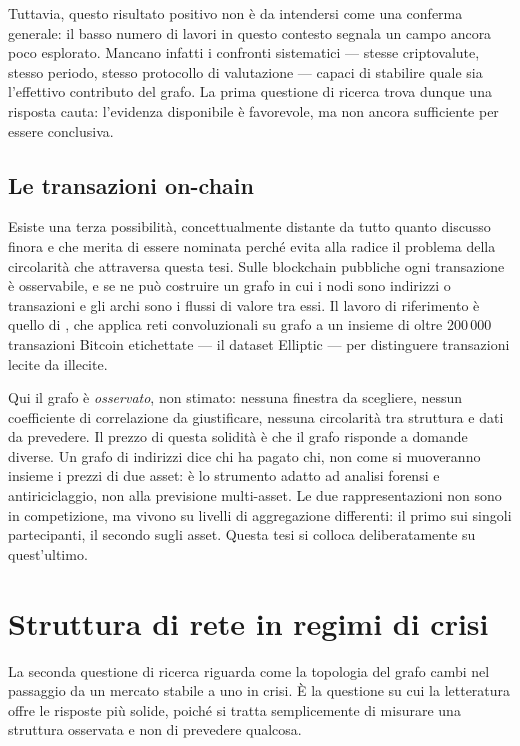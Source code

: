 Tuttavia, questo risultato positivo non è da intendersi come una conferma generale: il basso numero di lavori in questo contesto segnala un campo ancora poco esplorato. Mancano infatti i confronti sistematici — stesse criptovalute, stesso periodo, stesso protocollo di valutazione — capaci di stabilire quale sia l'effettivo contributo del grafo. La prima questione di ricerca trova dunque una risposta cauta: l'evidenza disponibile è favorevole, ma non ancora sufficiente per essere conclusiva.

\subsection{Le transazioni on-chain}

Esiste una terza possibilità, concettualmente distante da tutto quanto discusso finora e che merita di essere nominata perché evita alla radice il problema della circolarità che attraversa questa tesi. Sulle blockchain pubbliche ogni transazione è osservabile, e se ne può costruire un grafo in cui i nodi sono indirizzi o transazioni e gli archi sono i flussi di valore tra essi. Il lavoro di riferimento è quello di \textcite{weber2019antimoney}, che applica reti convoluzionali su grafo a un insieme di oltre 200\,000 transazioni Bitcoin etichettate — il dataset Elliptic — per distinguere transazioni lecite da illecite.

Qui il grafo è \emph{osservato}, non stimato: nessuna finestra da scegliere, nessun coefficiente di correlazione da giustificare, nessuna circolarità tra struttura e dati da prevedere. Il prezzo di questa solidità è che il grafo risponde a domande diverse. Un grafo di indirizzi dice chi ha pagato chi, non come si muoveranno insieme i prezzi di due asset: è lo strumento adatto ad analisi forensi e antiriciclaggio, non alla previsione multi-asset. Le due rappresentazioni non sono in competizione, ma vivono su livelli di aggregazione differenti: il primo sui singoli partecipanti, il secondo sugli asset. Questa tesi si colloca deliberatamente su quest'ultimo.

\section{Struttura di rete in regimi di crisi}
\label{sec:network-structure-crisis-regimes}

La seconda questione di ricerca riguarda come la topologia del grafo cambi nel passaggio da un mercato stabile a uno in crisi. È la questione su cui la letteratura offre le risposte più solide, poiché si tratta semplicemente di misurare una struttura osservata e non di prevedere qualcosa.

